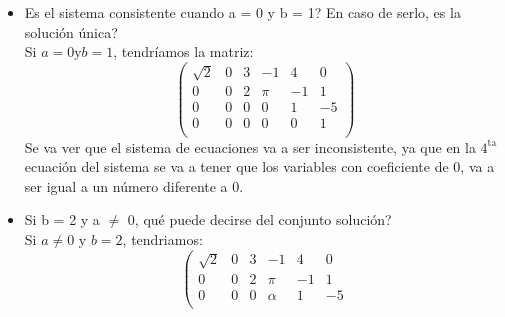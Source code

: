 \documentclass{article}
\begin{document}
\begin{enumerate}
\begin{itemize}
\[\begin{array}{ccccc|c}
                        0           & 0        & 2        & \pi      & -1       & 1 \\
                        0           & 0        & 0        & 1        & 1        & -5 \\
                        0           & 0        & 0        & 0        & 0        & 0 \\
                    \end{array}
                    \right)
                \]
                Obteniendo que el sistema es consistente y tiene infinitas soluciones. 
                Ya que la \(4^{\text{ta}}\) ecuación del sistema implica que las variables del sistema pueden tener infinitas soluciones.
            \item Es el sistema consistente cuando a = 0 y b = 1? En caso de serlo, es la solución única? \\
                Si \(a = 0 \text{y} b = 1\), tendríamos la matriz:
                \[
                    \left(
                    \begin{array}{ccccc|c}
                        \sqrt{2}    & 0        & 3        & -1       & 4        & 0 \\
                        0           & 0        & 2        & \pi      & -1       & 1 \\
                        0           & 0        & 0        & 0        & 1        & -5 \\
                        0           & 0        & 0        & 0        & 0        & 1 \\
                    \end{array}
                    \right)
                \]
                Se va ver que el sistema de ecuaciones va a ser inconsistente, ya que en la \(4^{\text{ta}}\) ecuación del sistema se va a 
                tener que los variables con coeficiente de 0, va a ser igual a un número diferente a 0.
            \item Si b = 2 y a \(\neq\) 0, qué puede decirse del conjunto solución? \\
                Si \(a \neq 0 \text{ y } b = 2\), tendriamos:
                \[
                    \left(
                    \begin{array}{ccccc|c}
                        \sqrt{2}    & 0        & 3        & -1       & 4        & 0 \\
                        0           & 0        & 2        & \pi      & -1       & 1 \\
                        0           & 0        & 0        & \alpha   & 1        & -5 \\

\end{array}\]
\end{itemize}
\end{enumerate}
\end{document}
